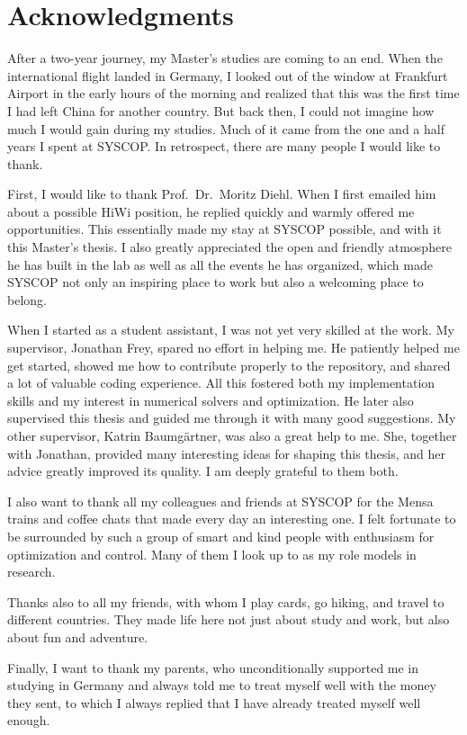 \documentclass[class=scrbook, crop=false]{standalone}
\begin{document}
\chapter{Acknowledgments}
\label{Chapter: Acknowledgments}
    After a two-year journey, my Master's studies are coming to an end.
    When the international flight landed in Germany,
    I looked out of the window at Frankfurt Airport in the early hours of the morning
    and realized that this was the first time I had left China for another country.
    But back then, I could not imagine how much I would gain during my studies.
    Much of it came from the one and a half years I spent at SYSCOP.
    In retrospect, there are many people I would like to thank.

    First, I would like to thank Prof.~Dr.~Moritz Diehl. 
    When I first emailed him about a possible HiWi position,
    he replied quickly and warmly offered me opportunities.
    This essentially made my stay at SYSCOP possible, and with it this Master's thesis.
    I also greatly appreciated the open and friendly atmosphere he has built in the lab 
    as well as all the events he has organized,
    which made SYSCOP not only an inspiring place to work but also a welcoming place to belong.

    When I started as a student assistant, I was not yet very skilled at the work.
    My supervisor, Jonathan Frey, spared no effort in helping me.
    He patiently helped me get started, showed me how to contribute properly to the repository,
    and shared a lot of valuable coding experience.
    All this fostered both my implementation skills and my interest in numerical solvers and optimization.
    He later also supervised this thesis and guided me through it with many good suggestions.
    My other supervisor, Katrin Baumgärtner, was also a great help to me.
    She, together with Jonathan, provided many interesting ideas for shaping this thesis,
    and her advice greatly improved its quality.
    I am deeply grateful to them both.

    I also want to thank all my colleagues and friends at SYSCOP
    for the Mensa trains and coffee chats that made every day an interesting one.
    I felt fortunate to be surrounded by
    such a group of smart and kind people with enthusiasm for optimization and control.
    Many of them I look up to as my role models in research.

    Thanks also to all my friends, with whom I play cards, go hiking, and travel to different countries.
    They made life here not just about study and work, but also about fun and adventure.

    Finally, I want to thank my parents, who unconditionally supported me in studying in Germany
    and always told me to treat myself well with the money they sent,
    to which I always replied that I have already treated myself well enough.
\end{document}
